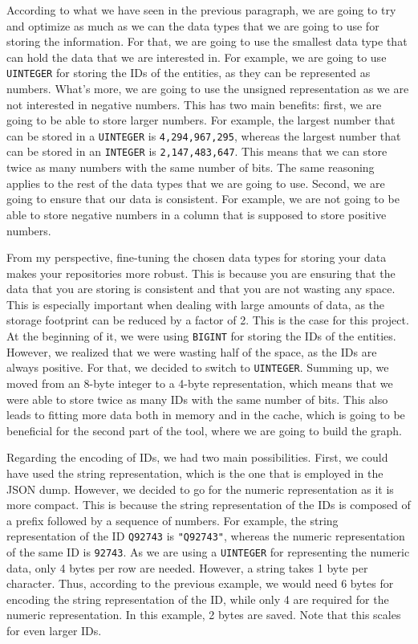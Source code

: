 According to what we have seen in the previous paragraph, we are going to try and optimize as much as we can the data types that we are going to use for storing the information. For that, we are going to use the smallest data type that can hold the data that we are interested in. For example, we are going to use \texttt{UINTEGER} for storing the IDs of the entities, as they can be represented as numbers. What's more, we are going to use the unsigned representation as we are not interested in negative numbers. This has two main benefits: first, we are going to be able to store larger numbers. For example, the largest number that can be stored in a \texttt{UINTEGER} is \texttt{4,294,967,295}, whereas the largest number that can be stored in an \texttt{INTEGER} is \texttt{2,147,483,647}. This means that we can store twice as many numbers with the same number of bits. The same reasoning applies to the rest of the data types that we are going to use. Second, we are going to ensure that our data is consistent. For example, we are not going to be able to store negative numbers in a column that is supposed to store positive numbers.

From my perspective, fine-tuning the chosen data types for storing your data makes your repositories more robust. This is because you are ensuring that the data that you are storing is consistent and that you are not wasting any space. This is especially important when dealing with large amounts of data, as the storage footprint can be reduced by a factor of 2. This is the case for this project. At the beginning of it, we were using \texttt{BIGINT} for storing the IDs of the entities. However, we realized that we were wasting half of the space, as the IDs are always positive. For that, we decided to switch to \texttt{UINTEGER}. Summing up, we moved from an 8-byte integer to a 4-byte representation, which means that we were able to store twice as many IDs with the same number of bits. This also leads to fitting more data both in memory and in the cache, which is going to be beneficial for the second part of the tool, where we are going to build the graph.

Regarding the encoding of IDs, we had two main possibilities. First, we could have used the string representation, which is the one that is employed in the JSON dump. However, we decided to go for the numeric representation as it is more compact. This is because the string representation of the IDs is composed of a prefix followed by a sequence of numbers. For example, the string representation of the ID \texttt{Q92743} is \texttt{"Q92743"}, whereas the numeric representation of the same ID is \texttt{92743}. As we are using a \texttt{UINTEGER} for representing the numeric data, only 4 bytes per row are needed. However, a string takes 1 byte per character. Thus, according to the previous example, we would need 6 bytes for encoding the string representation of the ID, while only 4 are required for the numeric representation. In this example, 2 bytes are saved. Note that this scales for even larger IDs.

